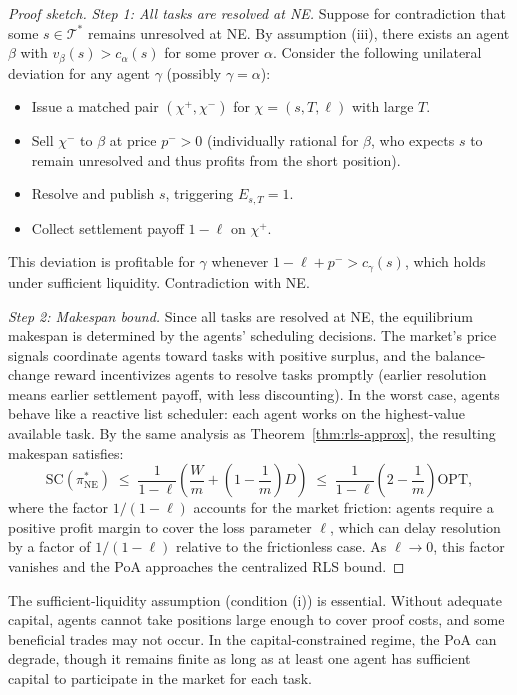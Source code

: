 \begin{proof}[Proof sketch]
\emph{Step 1: All tasks are resolved at NE.} Suppose for contradiction that some $s\in\mathcal{T}^*$ remains unresolved at NE. By assumption (iii), there exists an agent $\beta$ with $v_\beta(s) > c_\alpha(s)$ for some prover $\alpha$. Consider the following unilateral deviation for any agent $\gamma$ (possibly $\gamma = \alpha$): 
\begin{itemize}
    \item Issue a matched pair $(\chi^+,\chi^-)$ for $\chi = (s,T,\ell)$ with large $T$.
    \item Sell $\chi^-$ to $\beta$ at price $p^- > 0$ (individually rational for $\beta$, who expects $s$ to remain unresolved and thus profits from the short position).
    \item Resolve and publish $s$, triggering $E_{s,T}=1$.
    \item Collect settlement payoff $1-\ell$ on $\chi^+$.
\end{itemize}
This deviation is profitable for $\gamma$ whenever $1-\ell + p^- > c_\gamma(s)$, which holds under sufficient liquidity. Contradiction with NE.

\emph{Step 2: Makespan bound.} Since all tasks are resolved at NE, the equilibrium makespan is determined by the agents' scheduling decisions. The market's price signals coordinate agents toward tasks with positive surplus, and the balance-change reward incentivizes agents to resolve tasks promptly (earlier resolution means earlier settlement payoff, with less discounting). In the worst case, agents behave like a reactive list scheduler: each agent works on the highest-value available task. By the same analysis as Theorem~\ref{thm:rls-approx}, the resulting makespan satisfies:
\[
\mathrm{SC}(\pi^*_{\mathrm{NE}}) \;\le\; \frac{1}{1-\ell}\!\left(\frac{W}{m} + \left(1-\frac{1}{m}\right)D\right) \;\le\; \frac{1}{1-\ell}\!\left(2-\frac{1}{m}\right)\mathrm{OPT},
\]
where the factor $1/(1-\ell)$ accounts for the market friction: agents require a positive profit margin to cover the loss parameter $\ell$, which can delay resolution by a factor of $1/(1-\ell)$ relative to the frictionless case. As $\ell\to 0$, this factor vanishes and the PoA approaches the centralized RLS bound.
\end{proof}

\begin{remark}
The sufficient-liquidity assumption (condition (i)) is essential. Without adequate capital, agents cannot take positions large enough to cover proof costs, and some beneficial trades may not occur. In the capital-constrained regime, the PoA can degrade, though it remains finite as long as at least one agent has sufficient capital to participate in the market for each task.
\end{remark}

